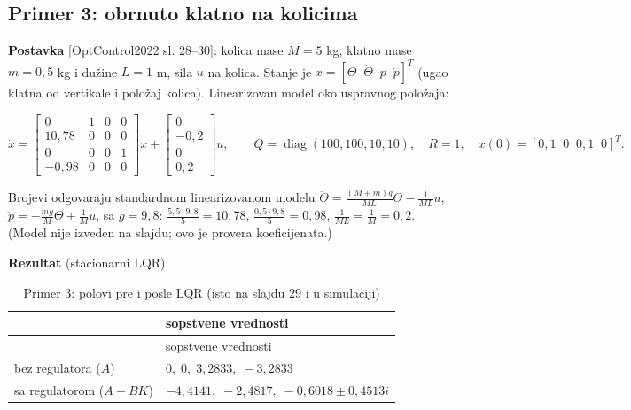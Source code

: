 \documentclass[11pt,a4paper,parskip=half,headsepline,numbers=noenddot]{scrartcl}
\DeclareRobustCommand{\izvor}[1]{{\small\color{izvorC}[#1]}}
\begin{document}
\subsection{Primer 3: obrnuto klatno na kolicima}

\textbf{Postavka} \izvor{OptControl2022 sl. 28--30}: kolica mase \(M = 5\) kg, klatno mase \(m = 0{,}5\) kg i dužine \(L = 1\) m, sila \(u\) na kolica. Stanje je \(x = [\Theta\;\; \dot\Theta\;\; p\;\; \dot p]^T\) (ugao klatna od vertikale i položaj kolica). Linearizovan model oko uspravnog položaja:

\[\dot x = \begin{bmatrix} 0 & 1 & 0 & 0 \\ 10{,}78 & 0 & 0 & 0 \\ 0 & 0 & 0 & 1 \\ -0{,}98 & 0 & 0 & 0\end{bmatrix}x + \begin{bmatrix} 0 \\ -0{,}2 \\ 0 \\ 0{,}2\end{bmatrix}u, \qquad Q = \operatorname{diag}(100, 100, 10, 10), \quad R = 1, \quad x(0) = [0{,}1\;\; 0\;\; 0{,}1\;\; 0]^T .\]

Brojevi odgovaraju standardnom linearizovanom modelu \(\ddot\Theta = \frac{(M + m)g}{ML}\Theta - \frac{1}{ML}u\), \(\ddot p = -\frac{mg}{M}\Theta + \frac1Mu\), sa \(g = 9{,}8\): \(\frac{5{,}5\cdot9{,}8}{5} = 10{,}78\), \(\frac{0{,}5\cdot9{,}8}{5} = 0{,}98\), \(\frac1{ML} = \frac1M = 0{,}2\). (Model nije izveden na slajdu; ovo je provera koeficijenata.)

\textbf{Rezultat} (stacionarni LQR):

\begin{longtable}[]{@{}
  >{\raggedright\arraybackslash}p{}
  >{\raggedright\arraybackslash}p{}@{}}
\caption{Primer 3: polovi pre i posle LQR (isto na slajdu 29 i u simulaciji)}\tabularnewline
\toprule\noalign{}
\begin{minipage}[b]{\linewidth}\raggedright
\end{minipage} & \begin{minipage}[b]{\linewidth}\raggedright
sopstvene vrednosti
\end{minipage} \\
\midrule\noalign{}
\endfirsthead
\toprule\noalign{}
\begin{minipage}[b]{\linewidth}\raggedright
\end{minipage} & \begin{minipage}[b]{\linewidth}\raggedright
sopstvene vrednosti
\end{minipage} \\
\midrule\noalign{}
\endhead
\bottomrule\noalign{}
\endlastfoot
bez regulatora (\(A\)) & \(0,\; 0,\; 3{,}2833,\; -3{,}2833\) \\
sa regulatorom (\(A - BK\)) & \(-4{,}4141,\; -2{,}4817,\; -0{,}6018 \pm 0{,}4513i\) \\
\end{longtable}
\end{document}
